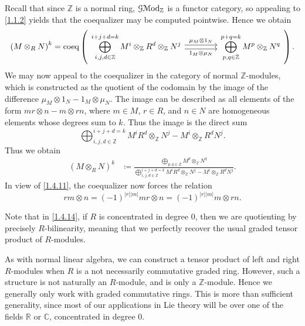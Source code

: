 \begin{construction}
	Recall that since $\mathbb{Z} $ is a normal ring, $\mathcal{G} \mathcal{M}\mathrm{od} _\mathbb{Z} $ is a functor category, so appealing to \cref{1.1.2} yields that the coequalizer may be computed pointwise. Hence we obtain
	\[
		\left( M\otimes _RN \right) ^k = \operatorname{coeq} \left( 
			\begin{tikzcd}[column sep=4em]
				\displaystyle{\bigoplus_{i,j,d\in\mathbb{Z} } ^{i+j+d=k} M^i \otimes _\mathbb{Z} R^d \otimes _\mathbb{Z} N^j} \ar[" \mu_M \otimes 1_N ", shift left, r] \ar[" 1_M\otimes \mu _N "', shift right, r] & \displaystyle{\bigoplus_{p,q\in\mathbb{Z} } ^{p+q=k} M^p\otimes _\mathbb{Z} N^q}
			\end{tikzcd}
		\right) 
	.\]
	We may now appeal to the coequalizer in the category of normal $\mathbb{Z} $-modules, which is constructed as the quotient of the codomain by the image of the difference $\mu _M \otimes 1_N - 1_M \otimes \mu _N$. The image can be described as all elements of the form $mr \otimes n - m\otimes rn$, where $m\in M$, $r\in R$, and $n\in N$ are homogeneous elements whose degrees sum to $k$. Thus the image is the direct sum
	\[
		\bigoplus_{i,j,d\in\mathbb{Z} } ^{i+j+d=k} M^iR^d\otimes _\mathbb{Z} N^j - M^i\otimes _\mathbb{Z} R^dN^j
	.\]
	Thus we obtain
	\begin{align*}
		\left( M\otimes _RN \right) ^k &\coloneqq \frac{\displaystyle{\bigoplus_{p,q\in\mathbb{Z} }M^p\otimes _\mathbb{Z} N^q}}{\displaystyle{\bigoplus_{i,j,d\in\mathbb{Z} } ^{i+j+d=k} M^iR^d\otimes_\mathbb{Z} N^j - M^i \otimes_\mathbb{Z}  R^dN^j}} 
	.\end{align*}
	In view of \cref{1.4.11}, the coequalizer now forces the relation
	\[
		r m\otimes n = (-1)^{\left| r \right| \left| m \right| } mr\otimes n = (-1)^{\left| r \right| \left| m \right| } m\otimes rn
	.\]
\end{construction}

\begin{remark}\label{1.4.15}
	Note that in \cref{1.4.14}, if $R$ is concentrated in degree 0, then we are quotienting by precisely $R$-bilinearity, meaning that we perfectly recover the usual graded tensor product of $R$-modules.
\end{remark}


\begin{remark}\label{1.4.16}
	As with normal linear algebra, we can construct a tensor product of left and right $R$-modules when $R$ is a not necessarily commutative graded ring. However, such a structure is not naturally an $R$-module, and is only a $\mathbb{Z} $-module. Hence we generally only work with graded commutative rings. This is more than sufficient generality, since most of our applications in Lie theory will be over one of the fields $\mathbb{R} $ or $\mathbb{C} $, concentrated in degree 0.
\end{remark}

